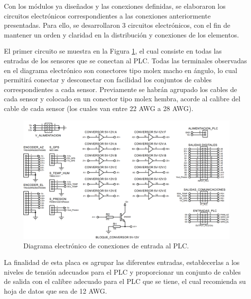 Con los módulos ya diseñados y las conexiones definidas, se elaboraron los circuitos electrónicos correspondientes a las conexiones anteriormente presentadas. Para ello, se desarrollaron 3 circuitos electrónicos, con el fin de mantener un orden y claridad en la distribución y conexiones de los elementos.

El primer circuito se muestra en la Figura \ref{fig:Cto_IO}, el cual consiste en todas las entradas de los sensores que se conectan al PLC. Todas las terminales observadas en el diagrama electrónico son conectores tipo molex macho en ángulo, lo cual permitirá conectar y desconectar con facilidad los conjuntos de cables correspondientes a cada sensor. Previamente se habrán agrupado los cables de cada sensor y colocado en un conector tipo molex hembra, acorde al calibre del cable de cada sensor (los cuales van entre 22 AWG a 28 AWG).
\begin{figure}[H]
	\centering
	\includegraphics[width=\columnwidth]{imagenes/circuito_IO}
	\caption{Diagrama electrónico de conexiones de entrada al PLC.}
	\label{fig:Cto_IO}
\end{figure}
La finalidad de esta placa es agrupar las diferentes entradas, establecerlas a los niveles de tensión adecuados para el PLC y proporcionar un conjunto de cables de salida con el calibre adecuado para el PLC que se tiene, el cual recomienda su hoja de datos que sea de 12 AWG.

